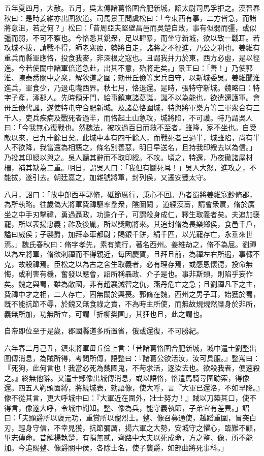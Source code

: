 \begin{pinyinscope}
五年夏四月，大赦。五月，吳太傅諸葛恪圍合肥新城，詔太尉司馬孚拒之。漢晉春秋曰：是時姜維亦出圍狄道。司馬景王問虞松曰：「今東西有事，二方皆急，而諸將意沮，若之何？」松曰：「昔周亞夫堅壁昌邑而吳楚自敗，事有似弱而彊，或似彊而弱，不可不察也。今恪悉其銳衆，足以肆暴，而坐守新城，欲以致一戰耳。若攻城不拔，請戰不得，師老衆疲，勢將自走，諸將之不徑進，乃公之利也。姜維有重兵而縣軍應恪，投食我麥，非深根之寇也。且謂我并力於東，西方必虛，是以徑進。今若使關中諸軍倍道急赴，出其不意，殆將走矣。」景王曰：「善！」乃使郭淮、陳泰悉關中之衆，解狄道之圍；勑毌丘儉等案兵自守，以新城委吳。姜維聞淮進兵，軍食少，乃退屯隴西界。秋七月，恪退還。是時，張特守新城。魏略曰：特字子產，涿郡人。先時領牙門，給事鎮東諸葛誕，誕不以為能也，欲遣還護軍。會毌丘儉代誕，遂使特屯守合肥新城。及諸葛恪圍城，特與將軍樂方等三軍衆合有三千人，吏兵疾病及戰死者過半，而恪起土山急攻，城將陷，不可護。特乃謂吳人曰：「今我無心復戰也。然魏法，被攻過百日而救不至者，雖降，家不坐也。自受敵以來，已九十餘日矣。此城中本有四千餘人，而戰死者已過半，城雖陷，尚有半人不欲降，我當還為相語之，條名別善惡，明日早送名，且持我印綬去以為信。」乃投其印綬以與之。吳人聽其辭而不取印綬。不攻。頃之，特還，乃夜徹諸屋材柵，補其缺為二重。明日，謂吳人曰：「我但有鬬死耳！」吳人大怒，進攻之，不能拔，遂引去。朝廷嘉之，加雜號將軍，封列侯，又遷安豐太守。

八月，詔曰：「故中郎西平郭脩，砥節厲行，秉心不回。乃者蜀將姜維寇鈔脩郡，為所執略。往歲偽大將軍費禕驅率羣衆，陰圖闚𨵦，道經漢壽，請會衆賔，脩於廣坐之中手刃擊禕，勇過聶政，功逾介子，可謂殺身成仁，釋生取義者矣。夫追加襃寵，所以表揚忠義；祚及後胤，所以獎勸將來。其追封脩為長樂鄉侯，食邑千戶，謚曰威侯；子襲爵，加拜奉車都尉；賜銀千鉼，絹千匹，以光寵存亡，永垂來世焉。」魏氏春秋曰：脩字孝先，素有業行，著名西州。姜維劫之，脩不為屈。劉禪以為左將軍，脩欲刺禪而不得親近，每因慶賀，且拜且前，為禪左右所遏，事輙不克，故殺禕焉。臣松之以為古之舍生取義者，必有理存焉，或感恩懷德，投命無悔，或利害有機，奮發以應會，詔所稱聶政、介子是也。事非斯類，則陷乎妄作矣。魏之與蜀，雖為敵國，非有趙襄滅智之仇，燕丹危亡之急；且劉禪凡下之主，費禕中才之相，二人存亡，固無關於興喪。郭脩在魏，西州之男子耳，始獲於蜀，旣不能抗節不辱，於魏又無食祿之責，不為時主所使，而無故規規然糜身於非所，義無所加，功無所立，可謂「折柳樊圃」，其狂也且，此之謂也。

自帝即位至于是歲，郡國縣道多所置省，俄或還復，不可勝紀。

六年春二月己丑，鎮東將軍毌丘儉上言：「昔諸葛恪圍合肥新城，城中遣士劉整出圍傳消息，為賊所得，考問所傳，語整曰：『諸葛公欲活汝，汝可具服。』整罵曰：『死狗，此何言也！我當必死為魏國鬼，不苟求活，逐汝去也。欲殺我者，便速殺之。』終無他辭。又遣士鄭像出城傳消息，或以語恪，恪遣馬騎尋圍跡索，得像還。四五人靮頭靣縛，將繞城表，勑語像，使大呼，言『大軍已還洛，不如早降。』像不從其言，更大呼城中曰：『大軍近在圍外，壯士努力！』賊以刀築其口，使不得言，像遂大呼，令城中聞知。整、像為兵，能守義執節，子弟宜有差異。」詔曰：「夫顯爵所以襃元功，重賞所以寵烈士。整、像召募通使，越蹈重圍，冒突白刃，輕身守信，不幸見獲，抗節彌厲，揚六軍之大勢，安城守之懼心，臨難不顧，畢志傳命。昔解楊執楚，有隕無貳，齊路中大夫以死成命，方之整、像，所不能加。今追賜整、像爵關中侯，各除士名，使子襲爵，如部曲將死事科。」


\end{pinyinscope}

